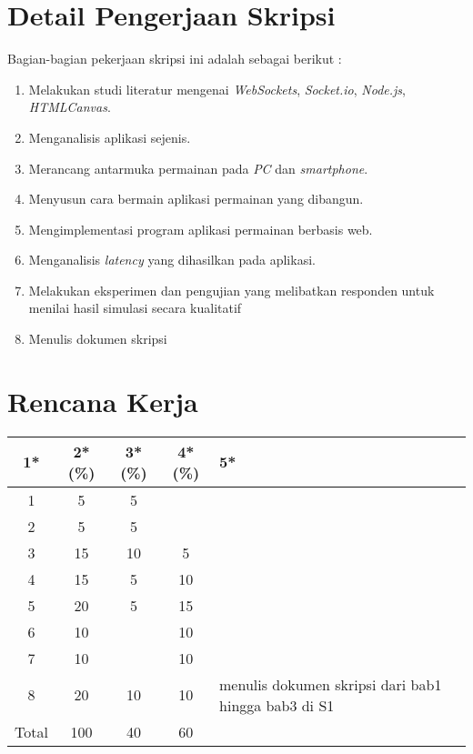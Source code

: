 \documentclass[a4paper,twoside]{article}
\begin{document}
\section{Detail Pengerjaan Skripsi}


Bagian-bagian pekerjaan skripsi ini adalah sebagai berikut :
	
	\begin{enumerate}
		\item Melakukan studi literatur mengenai \textit{WebSockets}, \textit{Socket.io}, \textit{Node.js}, \textit{HTMLCanvas}.
		\item Menganalisis aplikasi sejenis.
		\item Merancang antarmuka permainan pada \textit{PC} dan \textit{smartphone}.
		\item Menyusun cara bermain aplikasi permainan yang dibangun.
		\item Mengimplementasi program aplikasi permainan berbasis web.
		\item Menganalisis \textit{latency} yang dihasilkan pada aplikasi.
		\item Melakukan eksperimen dan pengujian yang melibatkan responden untuk menilai hasil simulasi secara kualitatif
		\item Menulis dokumen skripsi
	\end{enumerate}

\section{Rencana Kerja}

\begin{center}
  \begin{tabular}{ | c | c | c | c | l |}
    \hline
    1*  & 2*(\%) & 3*(\%) & 4*(\%) &5*\\ \hline \hline
    1 & 5 & 5 & & \\ \hline
    2 & 5 & 5 & & \\ \hline
    3 & 15 & 10 & 5 & \\ \hline
    4 & 15 & 5 & 10 & \\ \hline
    5 & 20 & 5 & 15 & \\ \hline
    6 & 10 &   & 10 & \\ \hline
    7 & 10 &  & 10 & \\ \hline
    8 & 20 & 10 & 10 & {\footnotesize menulis dokumen skripsi dari bab1 hingga bab3 di S1} \\ \hline
    Total & 100 & 40 & 60 & \\ \hline
                          \end{tabular}
\end{center}
\end{document}
